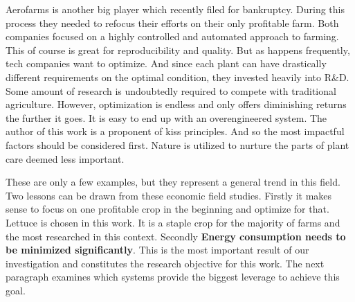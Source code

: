 Aerofarms is another big player which recently filed for bankruptcy.
During this process they needed to refocus their efforts on their only profitable farm.
Both companies focused on a highly controlled and automated approach to farming.
This of course is great for reproducibility and quality.
But as happens frequently, tech companies want to optimize.
And since each plant can have drastically different requirements on the optimal condition, they invested heavily into R\&D.
Some amount of research is undoubtedly required to compete with traditional agriculture.
However, optimization is endless and only offers diminishing returns the further it goes.
It is easy to end up with an overengineered system.
The author of this work is a proponent of \acs{kiss} principles.
And so the most impactful factors should be considered first.
Nature is utilized to nurture the parts of plant care deemed less important.

These are only a few examples, but they represent a general trend in this field.
Two lessons can be drawn from these economic field studies.
Firstly it makes sense to focus on one profitable crop in the beginning and optimize for that.
Lettuce is chosen in this work.
It is a staple crop for the majority of farms and the most researched in this context.
Secondly \textbf{Energy consumption needs to be minimized significantly}.
This is the most important result of our investigation and constitutes the research objective for this work.
The next paragraph examines which systems provide the biggest leverage to achieve this goal.


